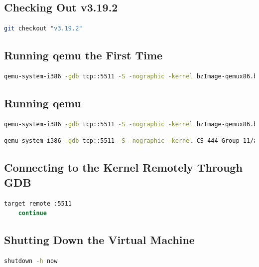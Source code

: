 \documentclass[letterpaper, onecolumn, draftclsnofoot, 10pt, compsoc]{IEEEtran}
\begin{document}
    \subsection{Checking Out v3.19.2}
    \begin{lstlisting}[language=bash]
    git checkout "v3.19.2"
    \end{lstlisting}
    
    \subsection{Running qemu the First Time}
    \begin{lstlisting}[language=bash]
    qemu-system-i386 -gdb tcp::5511 -S -nographic -kernel bzImage-qemux86.bin -drive file=core-image-lsb-sdk-qemux86.ext4,if=virtio -enable-kvm -net none -usb -localtime --no-reboot --append "root=/dev/vda rw console=ttyS0 debug"
    \end{lstlisting}
    
    \subsection{Running qemu}
    \begin{lstlisting}[language=bash, caption=Original Kernel]
    qemu-system-i386 -gdb tcp::5511 -S -nographic -kernel bzImage-qemux86.bin -drive file=core-image-lsb-sdk-qemux86.ext4,if=virtio -enable-kvm -net none -usb -localtime --no-reboot --append "root=/dev/vda rw console=ttyS0 debug"
    \end{lstlisting}
    \begin{lstlisting}[language=bash, caption=Our Kernel]
    qemu-system-i386 -gdb tcp::5511 -S -nographic -kernel CS-444-Group-11/arch/x86/boot/bzImage -drive file=common/core-image-lsb-sdk-qemux86.ext4,if=virtio -enable-kvm -net none -usb -localtime --no-reboot --append "root=/dev/vda rw console=ttyS0 debug"
    \end{lstlisting}
    
    \subsection{Connecting to the Kernel Remotely Through GDB}
    \begin{lstlisting}[language=bash]
    target remote :5511
    continue
    \end{lstlisting}
    
    \subsection{Shutting Down the Virtual Machine}
    \begin{lstlisting}[language=bash]
    shutdown -h now 
    \end{lstlisting}
    
\end{document}
